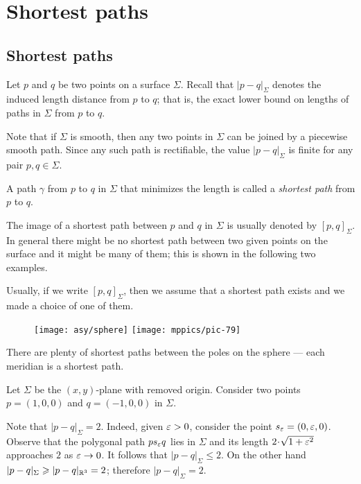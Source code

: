 \chapter{Shortest paths}




\section*{Shortest paths}

Let $p$ and $q$ be two points on a surface $\Sigma$.
Recall that $|p-q|_\Sigma$ denotes the induced length distance from $p$ to $q$;
that is, the exact lower bound on lengths of paths in $\Sigma$ from $p$ to $q$.

Note that if $\Sigma$ is smooth, then any two points in $\Sigma$ can be joined by a piecewise smooth path.
Since any such path is rectifiable, the value $|p-q|_\Sigma$ is finite for any pair $p,q\in\Sigma$.

A path $\gamma$ from $p$ to $q$ in $\Sigma$ that minimizes the length is called a \emph{shortest path} from $p$ to $q$.

The image of a shortest path between $p$ and $q$ in $\Sigma$ is usually denoted by $[p,q]_\Sigma$.
In general there might be no shortest path between two given points on the surface
and it might be many of them;
this is shown in the following two examples.

Usually, if we write $[p,q]_\Sigma$, then we assume that a shortest path exists and we made a choice of one of them.

\begin{wrapfigure}{r}{28 mm}
\vskip-4mm
\centering
\texttt{[image: asy/sphere]}
\bigskip
\texttt{[image: mppics/pic-79]}
\end{wrapfigure}

 There are plenty of shortest paths between the poles on the sphere --- each meridian is a shortest path.

 Let $\Sigma$ be the $(x,y)$-plane with removed origin.
Consider two points $p=(1,0,0)$ and $q=(-1,0,0)$ in $\Sigma$.

Note that $|p-q|_\Sigma=2$. 
Indeed, given $\eps\z>0$, consider the point $s_\varepsilon=(0,\varepsilon,0)$.
Observe that the polygonal path $ps_\varepsilon q$ lies in $\Sigma$ and its length $2\cdot\sqrt{1+\eps^2}$ approaches $2$ as $\varepsilon\to0$.
It follows that $|p-q|_\Sigma\le 2$.
On the other hand $|p-q|_\Sigma\geqslant |p-q|_{\mathbb{R}^3}=2$; therefore $|p-q|_\Sigma= 2$.


